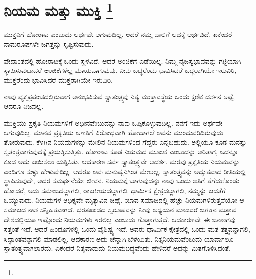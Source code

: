 
\chapter[ನಿಯಮ ಮತ್ತು ಮುಕ್ತಿ ]{ನಿಯಮ ಮತ್ತು ಮುಕ್ತಿ \protect\footnote{}}

ಮುಕ್ತನಿಗೆ ಹೋರಾಟ ಎಂಬುದು ಅರ್ಥವೇ ಆಗುವುದಿಲ್ಲ. ಆದರೆ ನಮ್ಮ ಪಾಲಿಗೆ ಅದಕ್ಕೆ ಅರ್ಥವಿದೆ. ಏಕೆಂದರೆ ನಾಮರೂಪಗಳೇ ಜಗತ್ತನ್ನು ಸೃಷ್ಟಿಸುವುದು.

ವೇದಾಂತದಲ್ಲಿ ಹೋರಾಟಕ್ಕೆ ಒಂದು ಸ್ಥಳವಿದೆ, ಆದರೆ ಅಂಜಿಕೆಗೆ ಎಡೆಯಿಲ್ಲ. ನಿಮ್ಮ ನೈಜಸ್ವಭಾವವನ್ನು ಗಟ್ಟಿಯಾಗಿ ಸ್ಥಾಪಿಸುವುದಾದರೆ ಅಂಜಿಕೆಗಳೆಲ್ಲ ಮಾಯವಾಗುವುವು. ನೀವು ಬದ್ಧರೆಂದು ಭಾವಿಸಿದರೆ ಬದ್ಧರಾಗಿಯೇ ಇರುವಿರಿ, ಮುಕ್ತರೆಂದು ಭಾವಿಸಿದರೆ ಮುಕ್ತರಾಗಿಯೇ ಇರುವಿರಿ.

ನಾವು ವ್ಯಕ್ತಪ್ರಪಂಚದಲ್ಲಿರುವಾಗ ಅನುಭವಿಸುವ ಸ್ವಾತಂತ್ರ್ಯವು ನಿತ್ಯ ಮುಕ್ತಾವಸ್ಥೆಯ ಒಂದು ಕ್ಷಣಿಕ ದರ್ಶನ ಅಷ್ಟೆ, ಆದರೂ ನಿಜವಲ್ಲ.

ಮುಕ್ತಿಯು ಪ್ರಕೃತಿ ನಿಯಮಗಳಿಗೆ ಅಧೀನವೆಂಬುದನ್ನು ನಾವು ಒಪ್ಪಿಕೊಳ್ಳುವುದಿಲ್ಲ. ನನಗೆ ಇದು ಅರ್ಥವೇ ಆಗುವುದಿಲ್ಲ. ಮಾನವ ಪ್ರಕೃತಿಯ ಅಣತಿಗೆ ವಿರೋಧವಾಗಿ ಹೋದಾಗಲೆ ಅವನು ಮುಂದುವರಿದಿರುವುದು ತೋರುವುದು. ಕೆಳಗಿನ ನಿಯಮಗಳನ್ನು ಮೇಲಿನ ನಿಯಮಗಳಿಂದ ಗೆದ್ದರು ಎನ್ನಬಹುದು. ಅಲ್ಲಿಯೂ ಕೂಡ ಮನಸ್ಸು ಸ್ವತಂತ್ರವಾಗುವುದಕ್ಕೆ ಪ್ರಯತ್ನಿಸುತ್ತಿತ್ತು. ಹೋರಾಟ ಕೂಡ ನಿಯಮದ ಮೂಲಕ ಎಂಬುದನ್ನು ಅರಿತಾಗ, ಅದನ್ನೂ ಕೂಡ ಅದು ಜಯಿಸಲು ಯತ್ನಿಸಿತು. ಆದಕಾರಣ ಸರ್ವ ಸ್ವಾತಂತ್ರ್ಯವೇ ಆದರ್ಶ. ಮರವು ಪ್ರಕೃತಿಯ ನಿಯಮವನ್ನು ಎಂದಿಗೂ ಸುಳ್ಳು ಹೇಳುವುದಿಲ್ಲ. ಆದರೂ ಅವು ಮನುಷ್ಯನಿಗಿಂತ ಮೇಲಲ್ಲ. ಸ್ವಾತಂತ್ರ್ಯವನ್ನು ಅದ್ಭುತವಾದ ರೀತಿಯಲ್ಲಿ ಸ್ಥಾಪಿಸುವುದೇ, ಅದರ ಸಮರ್ಥನೆಯೇ ಜೀವನ. ನಿಯಮಕ್ಕೆ ಬಾಗುವುದನ್ನು ನಾವು ಒಂದು ಅತಿಗೆ ತೆಗೆದುಕೊಂಡು ಹೋದರೆ, ಅದು ಸಮಾಜದಲ್ಲಾಗಲಿ, ರಾಜಕೀಯದಲ್ಲಾಗಲಿ, ಧಾರ್ಮಿಕ ಕ್ಷೇತ್ರದಲ್ಲಾಗಲಿ, ನಮ್ಮನ್ನು ಜಡತೆಗೆ ಒಯ್ಯುವುದು. ನಿಯಮಗಳ ಆಧಿಕ್ಯವೇ ಮೃತ್ಯುವಿನ ಚಿಹ್ನೆ. ಯಾವ ಸಮಾಜದಲ್ಲಿ ಹೆಚ್ಚು ನಿಯಮಗಳಿರುತ್ತವೆಯೋ ಆ ಸಮಾಜದ ನಾಶ ಸನ್ನಿಹಿತವಾಗಿದೆ. ಭರತಖಂಡದ ಸ್ವರೂಪವನ್ನು ನೀವು ಅಧ್ಯಯನ ಮಾಡಿದರೆ ಜಗತ್ತಿನ ಮತ್ತಾವ ದೇಶದಲ್ಲಿಯೂ ಇಷ್ಟೊಂದು ನಿಯಮಗಳು ಇರಲಿಲ್ಲ ಎಂಬುದು ಗೊತ್ತಾಗುತ್ತದೆ. ಆದಕಾರಣವೇ ಈ ಜನಾಂಗವು ಸತ್ತಂತೆ ಇದೆ. ಆದರೆ ಹಿಂದೂಗಳಲ್ಲಿ ಒಂದು ವೈಶಿಷ್ಟ್ಯ ಇದೆ. ಅವರು ಧಾರ್ಮಿಕ ಕ್ಷೇತ್ರದಲ್ಲಿ ಒಂದು ಮತ ತತ್ತ್ವವನ್ನಾಗಲಿ, ಸಿದ್ಧಾಂತವನ್ನಾಗಲಿ ಮಾಡಲಿಲ್ಲ. ಆದಕಾರಣ ಅದು ಚೆನ್ನಾಗಿ ಬೆಳೆಯಿತು. ನಿತ್ಯನಿಯಮವೆಂಬುದು ಯಾವಾಗಲೂ ಸ್ವಾತಂತ್ರ್ಯವಾಗಲಾರದು. ಏಕೆಂದರೆ ನಿತ್ಯವಾದುದು ನಿಯಮಬದ್ಧವೆಂದು ಹೇಳಿದರೆ ಅದನ್ನು ಮಿತಗೊಳಿಸಿದಂತೆ.

